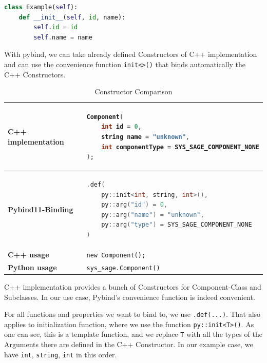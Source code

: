 \begin{lstlisting}[language=Python, xleftmargin=4em, frame = single]
class Example(self):
    def __init__(self, id, name):
        self.id = id
        self.name = name
\end{lstlisting}

With pybind, we can take already defined Constructors of C++ implementation and can use the convenience function \verb|init<>()| that binds automatically the C++ Constructors.

\begin{table}[htbp]
\centering
\begin{tabular}{|l|l|}
\hline
\textbf{C++ implementation} &
\begin{lstlisting}[language=C++]
Component(
    int id = 0,
    string name = "unknown",
    int componentType = SYS_SAGE_COMPONENT_NONE
);
\end{lstlisting}
\\ \hline
\textbf{Pybind11-Binding} &
\begin{lstlisting}[language=C++]
.def(
    py::init<int, string, int>(),
    py::arg("id") = 0,
    py::arg("name") = "unknown",
    py::arg("type") = SYS_SAGE_COMPONENT_NONE
)
\end{lstlisting}
\\ \hline
\textbf{C++ usage} &
\verb|new Component();| \\ \hline
\textbf{Python usage} &
\verb|sys_sage.Component()| \\ \hline
\end{tabular}
\caption{Constructor Comparison}
\label{tab:constructor}
\end{table}

C++ implementation provides a bunch of Constructors for Component-Class and Subclasses. In our use case, Pybind's convenience function is indeed convenient.

For all functions and properties we want to bind to, we use \verb|.def(...)|. That also applies to initialization function, where we use the function \verb|py::init<T>()|. As one can see, this is a template function, and we replace \verb|T| with all the types of the Arguments there are defined in the C++ Constructor. In our example case, we have \verb|int|, \verb|string|, \verb|int| in this order.

